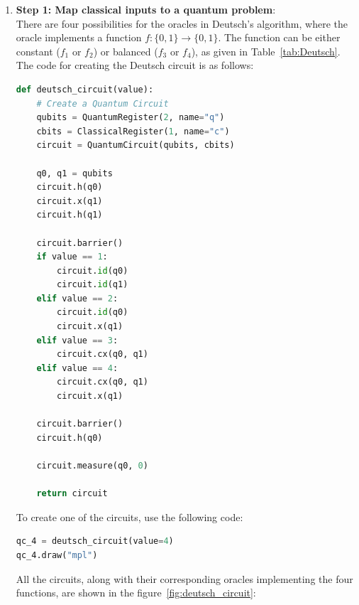 \begin{enumerate}
    \item \textbf{Step 1: Map classical inputs to a quantum problem}: \\
    There are four possibilities for the oracles in Deutsch's algorithm, where the oracle implements a function $f: \{0,1\} \rightarrow \{0,1\}$. The function can be either constant ($f_1$ or $f_2$) or balanced ($f_3$ or $f_4$), as given in Table~\ref{tab:Deutsch}. The code for creating the Deutsch circuit is as follows:

\begin{lstlisting}[language=Python]
def deutsch_circuit(value):
    # Create a Quantum Circuit
    qubits = QuantumRegister(2, name="q")
    cbits = ClassicalRegister(1, name="c")
    circuit = QuantumCircuit(qubits, cbits)

    q0, q1 = qubits
    circuit.h(q0)
    circuit.x(q1)
    circuit.h(q1)

    circuit.barrier()
    if value == 1:
        circuit.id(q0)
        circuit.id(q1)
    elif value == 2:
        circuit.id(q0)
        circuit.x(q1)
    elif value == 3:
        circuit.cx(q0, q1)
    elif value == 4:
        circuit.cx(q0, q1)
        circuit.x(q1)

    circuit.barrier()
    circuit.h(q0)

    circuit.measure(q0, 0)

    return circuit
\end{lstlisting}

    To create one of the circuits, use the following code:

\begin{lstlisting}[language=Python]
qc_4 = deutsch_circuit(value=4)
qc_4.draw("mpl")
\end{lstlisting}

    All the circuits, along with their corresponding oracles implementing the four functions, are shown in the figure~\ref{fig:deutsch_circuit}:


\end{enumerate}
